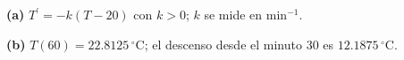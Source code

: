 \noindent\textbf{(a)} $T^{\prime}=-k(T-20)$ con $k>0$; $k$ se mide en $\mathrm{min}^{-1}$.

\noindent\textbf{(b)} $T(60)=22.8125\,{}^\circ\mathrm C$; el descenso desde el minuto 30 es $12.1875\,{}^\circ\mathrm C$.
